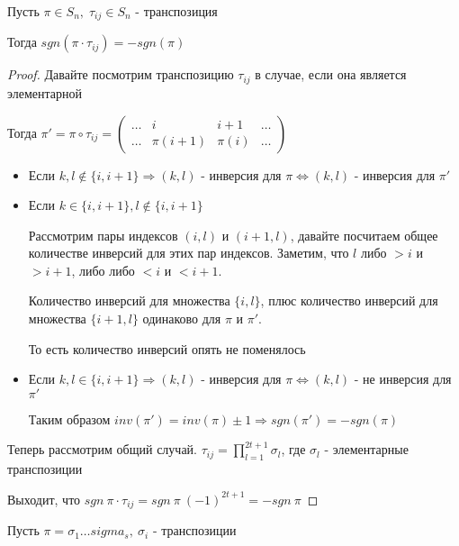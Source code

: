 \begin{theorem-non}
    Пусть $\pi \in S_n, \; \tau_{ij} \in S_n$ - транспозиция
    
    Тогда $sgn(\pi \cdot \tau_{ij}) = -sgn(\pi)$

    \begin{proof}
       Давайте посмотрим транспозицию $\tau_{ij}$ в случае, если она является элементарной 
       
       Тогда $\pi' = \pi \circ \tau_{ij} = \begin{pmatrix}
           \dots & i & i + 1 & \dots \\
           \dots & \pi(i + 1) & \pi(i) & \dots
       \end{pmatrix}$

       \begin{itemize}
            \item Если $k, l \notin \{i, i+1\} \Longrightarrow (k,l)$ - инверсия для $\pi 
                \Longleftrightarrow (k,l)$ - инверсия для $\pi'$ 
            \item Если $k \in \{i, i+1\}, l \notin \{i, i+1\}$

                Рассмотрим пары индексов $(i, l)$ и $(i+1, l)$, давайте посчитаем общее количестве инверсий для этих 
                пар индексов. Заметим, что $l$ либо $ > i$ и $ > i+ 1$, либо либо $ < i$ и $ < i+ 1$.

                Количество инверсий для множества $\{i,l\}$, плюс количество инверсий для множества $\{i+1, l\}$ одинаково для $\pi$ и $\pi'$.

                То есть количество инверсий опять не поменялось 
            \item Если $k, l \in \{i, i+1\} \Longrightarrow (k,l)$ - инверсия для $\pi \Longleftrightarrow 
            (k,l)$ - не инверсия для $\pi'$

            Таким образом $inv(\pi') = inv(\pi) \pm 1 \Longrightarrow sgn(\pi') = - sgn(\pi)$
        \end{itemize}
       
        Теперь рассмотрим общий случай. $\tau_{ij} = \prod\limits_{l=1}^{2t+1} \sigma_l$, где $\sigma_l$ - элементарные транспозиции

        Выходит, что $sgn \ \pi \cdot \tau_{ij} = sgn \ \pi \ (-1)^{2t+1} = -sgn \ \pi$
    \end{proof}
\end{theorem-non}

\follow \; Пусть $\pi = \sigma_1 \dots sigma_s, \ \sigma_i$ - транспозиции

